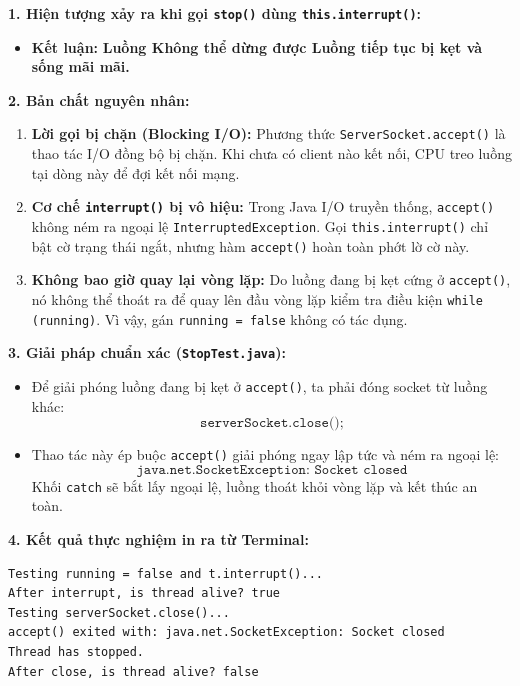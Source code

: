 \documentclass[11pt,a4paper]{article}
\begin{document}
\begin{solutionbox}[title=Phân tích \& Giải thích: Cơ chế Dừng luồng khi bị tắc nghẽn ở accept()]
\textbf{1. Hiện tượng xảy ra khi gọi \texttt{stop()} dùng \texttt{this.interrupt()}:}
\begin{itemize}
    \item \textbf{Kết luận:} \textbf{Luồng Không thể dừng được Luồng tiếp tục bị kẹt và sống mãi mãi.}
\end{itemize}

\textbf{2. Bản chất nguyên nhân:}
\begin{enumerate}
    \item \textbf{Lời gọi bị chặn (Blocking I/O):} Phương thức \texttt{ServerSocket.accept()} là thao tác I/O đồng bộ bị chặn. Khi chưa có client nào kết nối, CPU treo luồng tại dòng này để đợi kết nối mạng.
    \item \textbf{Cơ chế \texttt{interrupt()} bị vô hiệu:} Trong Java I/O truyền thống, \texttt{accept()} không ném ra ngoại lệ \texttt{InterruptedException}. Gọi \texttt{this.interrupt()} chỉ bật cờ trạng thái ngắt, nhưng hàm \texttt{accept()} hoàn toàn phớt lờ cờ này.
    \item \textbf{Không bao giờ quay lại vòng lặp:} Do luồng đang bị kẹt cứng ở \texttt{accept()}, nó không thể thoát ra để quay lên đầu vòng lặp kiểm tra điều kiện \texttt{while (running)}. Vì vậy, gán \texttt{running = false} không có tác dụng.
\end{enumerate}

\textbf{3. Giải pháp chuẩn xác (\texttt{StopTest.java}):}
\begin{itemize}
    \item Để giải phóng luồng đang bị kẹt ở \texttt{accept()}, ta phải đóng socket từ luồng khác:
    $$\texttt{serverSocket.close();}$$
    \item Thao tác này ép buộc \texttt{accept()} giải phóng ngay lập tức và ném ra ngoại lệ:
    $$\texttt{java.net.SocketException: Socket closed}$$
    Khối \texttt{catch} sẽ bắt lấy ngoại lệ, luồng thoát khỏi vòng lặp và kết thúc an toàn.
\end{itemize}

\textbf{4. Kết quả thực nghiệm in ra từ Terminal:}
\begin{verbatim}
Testing running = false and t.interrupt()...
After interrupt, is thread alive? true
Testing serverSocket.close()...
accept() exited with: java.net.SocketException: Socket closed
Thread has stopped.
After close, is thread alive? false
\end{verbatim}


\end{solutionbox}
\end{document}
